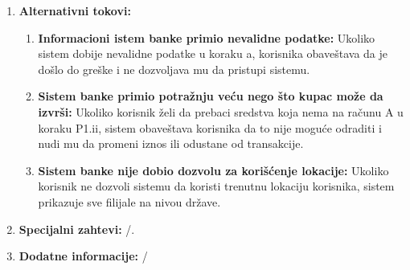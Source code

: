 \documentclass{article}
\begin{document}
\begin{enumerate}
\begin{enumerate}
      \end{enumerate}
  \item \textbf{Alternativni tokovi: } 
  \begin{enumerate}
    \item \textbf{Informacioni istem banke primio nevalidne podatke:} Ukoliko sistem dobije nevalidne podatke u koraku a, korisnika obaveštava da je došlo do greške i ne dozvoljava mu da pristupi sistemu.
    \item \textbf{Sistem banke primio potražnju veću nego što kupac može da izvrši: } Ukoliko korisnik želi da prebaci sredstva koja nema na računu A u koraku P1.ii, sistem obaveštava korisnika da to nije moguće odraditi i nudi mu da promeni iznos ili odustane od transakcije.
    \item \textbf{Sistem banke nije dobio dozvolu za korišćenje lokacije: } Ukoliko korisnik ne dozvoli sistemu da koristi trenutnu lokaciju korisnika, sistem prikazuje sve filijale na nivou države.
\end{enumerate}
  \item \textbf{Specijalni zahtevi: } /.
  \item \textbf{Dodatne informacije: } /
\end{enumerate}
\end{document}

